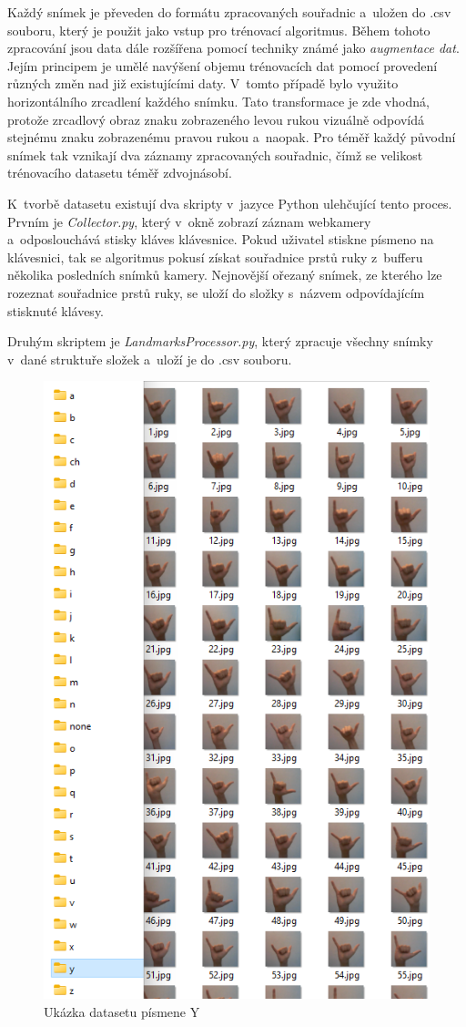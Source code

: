 \documentclass[
  master,
  program=ainfvs,
  biblatex,
  figures=true,
  tables=false,
  sourcecodes=true,
  glossaries,
  index
]{kidiplom}
\begin{document}
            Každý snímek je převeden do formátu zpracovaných souřadnic a~uložen do .csv souboru, který je použit jako vstup pro trénovací algoritmus. Během tohoto zpracování jsou data dále rozšířena pomocí techniky známé jako \emph{augmentace dat}. Jejím principem je umělé navýšení objemu trénovacích dat pomocí provedení různých změn nad již existujícími daty. V~tomto případě bylo využito horizontálního zrcadlení každého snímku. Tato transformace je zde vhodná, protože zrcadlový obraz znaku zobrazeného levou rukou vizuálně odpovídá stejnému znaku zobrazenému pravou rukou a~naopak. Pro téměř každý původní snímek tak vznikají dva záznamy zpracovaných souřadnic, čímž se velikost trénovacího datasetu téměř zdvojnásobí.

            K~tvorbě datasetu existují dva skripty v~jazyce Python ulehčující tento proces. Prvním je \emph{Collector.py}, který v~okně zobrazí záznam webkamery a~odposlouchává stisky kláves klávesnice. Pokud uživatel stiskne písmeno na klávesnici, tak se algoritmus pokusí získat souřadnice prstů ruky z~bufferu několika posledních snímků kamery. Nejnovější ořezaný snímek, ze kterého lze rozeznat souřadnice prstů ruky, se uloží do složky s~názvem odpovídajícím stisknuté klávesy. 
            
            Druhým skriptem je \emph{LandmarksProcessor.py}, který zpracuje všechny snímky v~dané struktuře složek a~uloží je do .csv souboru.


         \begin{figure}[H]
            \centering
            \includegraphics[width=0.55\columnwidth]{graphics/dataset.png}
            \caption{Ukázka datasetu písmene Y}
            \label{dataset}
        \end{figure}
           
\end{document}
